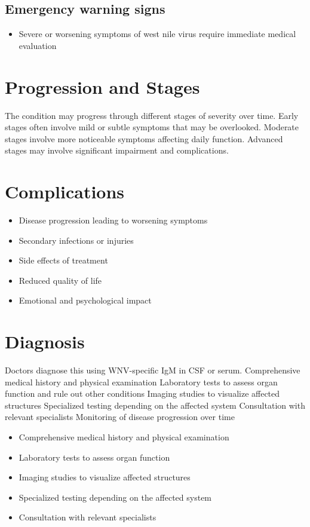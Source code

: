 \subsection{Emergency warning signs}
\begin{itemize}[noitemsep]
  \item Severe or worsening symptoms of west nile virus require immediate medical evaluation
\end{itemize}
\section{Progression and Stages}
The condition may progress through different stages of severity over time. Early stages often involve mild or subtle symptoms that may be overlooked. Moderate stages involve more noticeable symptoms affecting daily function. Advanced stages may involve significant impairment and complications.
\section{Complications}
\begin{itemize}[noitemsep]
  \item Disease progression leading to worsening symptoms
  \item Secondary infections or injuries
  \item Side effects of treatment
  \item Reduced quality of life
  \item Emotional and psychological impact
\end{itemize}
\section{Diagnosis}
Doctors diagnose this using WNV-specific IgM in CSF or serum. Comprehensive medical history and physical examination Laboratory tests to assess organ function and rule out other conditions Imaging studies to visualize affected structures Specialized testing depending on the affected system Consultation with relevant specialists Monitoring of disease progression over time

\begin{itemize}[noitemsep]
  \item Comprehensive medical history and physical examination
  \item Laboratory tests to assess organ function
  \item Imaging studies to visualize affected structures
  \item Specialized testing depending on the affected system
  \item Consultation with relevant specialists
\end{itemize}
